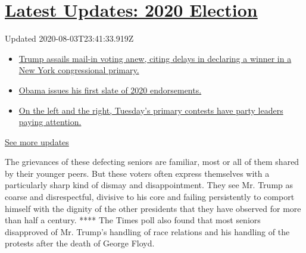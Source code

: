 \hypertarget{latest-updates-2020-election}{%
\section{\texorpdfstring{\href{https://www.nytimes.com/2020/08/03/us/elections/biden-vs-trump.html?action=click\&pgtype=Article\&state=default\&region=MAIN_CONTENT_1\&context=storylines_live_updates}{Latest
Updates: 2020
Election}}{Latest Updates: 2020 Election}}\label{latest-updates-2020-election}}

Updated 2020-08-03T23:41:33.919Z

\begin{itemize}
\tightlist
\item
  \href{https://www.nytimes.com/2020/08/03/us/elections/biden-vs-trump.html?action=click\&pgtype=Article\&state=default\&region=MAIN_CONTENT_1\&context=storylines_live_updates\#link-6494b448}{Trump
  assails mail-in voting anew, citing delays in declaring a winner in a
  New York congressional primary.}
\item
  \href{https://www.nytimes.com/2020/08/03/us/elections/biden-vs-trump.html?action=click\&pgtype=Article\&state=default\&region=MAIN_CONTENT_1\&context=storylines_live_updates\#link-3de249e6}{Obama
  issues his first slate of 2020 endorsements.}
\item
  \href{https://www.nytimes.com/2020/08/03/us/elections/biden-vs-trump.html?action=click\&pgtype=Article\&state=default\&region=MAIN_CONTENT_1\&context=storylines_live_updates\#link-2340e8b5}{On
  the left and the right, Tuesday's primary contests have party leaders
  paying attention.}
\end{itemize}

\href{https://www.nytimes.com/2020/08/03/us/elections/biden-vs-trump.html?action=click\&pgtype=Article\&state=default\&region=MAIN_CONTENT_1\&context=storylines_live_updates}{See
more updates}

The grievances of these defecting seniors are familiar, most or all of
them shared by their younger peers. But these voters often express
themselves with a particularly sharp kind of dismay and disappointment.
They see Mr. Trump as coarse and disrespectful, divisive to his core and
failing persistently to comport himself with the dignity of the other
presidents that they have observed for more than half a century. ****
The Times poll also found that most seniors disapproved of Mr. Trump's
handling of race relations and his handling of the protests after the
death of George Floyd.

